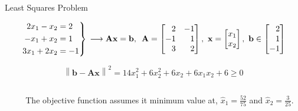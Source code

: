 \documentclass[aspectratio=169]{beamer}
\begin{document}
\begin{frame}[t]{Least Squares Problem}
\begin{scriptsize}
\[ 
    \begin{rcases*}
    \begin{split}
    2x_1 - x_2 & = 2 \\
    -x_1 + x_2 & = 1 \\
    3x_1 + 2x_2 & = -1
    \end{split}
    \end{rcases*} \, \longrightarrow \mathbf{Ax} = \mathbf{b}, \,\,\, \mathbf{A} = \begin{bmatrix*}[r] 2 & -1\\ -1 & 1\\3 & 2\end{bmatrix*}, \,\, \mathbf{x} = \begin{bmatrix*}[r] x_1\\ x_2\end{bmatrix*} , \,\, \mathbf{b} \in \begin{bmatrix*}[r]2\\1\\-1\end{bmatrix*}
\]

\[
    \left\lVert \mathbf{b} - \mathbf{Ax}\right\rVert^2 = 14x_1^2 + 6x_2^2 + 6x_2 + 6x_1x_2 + 6 \geq 0
\]
\end{scriptsize}

\vspace{-0.65cm}

\begin{columns}
\begin{column}{0.6\textwidth}
\begin{center}
\end{center}
\end{column}

\begin{column}{0.4\textwidth}
The objective function assumes it minimum value at, $\hat{x}_1 = \frac{52}{75}$ and $\hat{x}_2 = \frac{3}{25}$.
\end{column}
\end{columns}
\end{frame}
\end{document}
